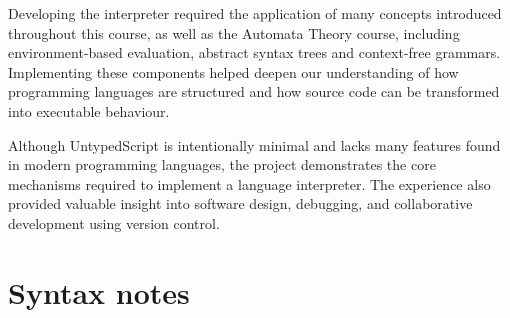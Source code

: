 \documentclass[12pt,a4paper]{article}
\begin{document}
Developing the interpreter required the application of many concepts introduced throughout this course, as well as the Automata Theory course, including environment-based evaluation, abstract syntax trees and context-free grammars. Implementing these components helped deepen our understanding of how programming languages are structured and how source code can be transformed into executable behaviour.

Although UntypedScript is intentionally minimal and lacks many features found in modern programming languages, the project demonstrates the core mechanisms required to implement a language interpreter. The experience also provided valuable insight into software design, debugging, and collaborative development using version control.


\newpage
\appendix

\section{Syntax notes}
\end{document}

